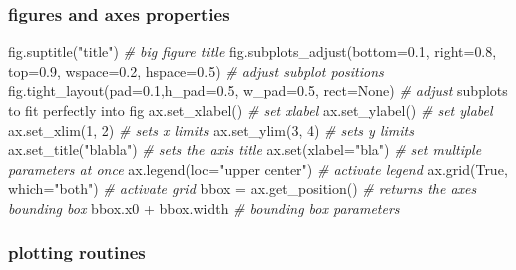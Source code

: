 \documentclass[]{article}
\newenvironment{Shaded}{}{}
\newcommand{\DataTypeTok}[1]{\textcolor[rgb]{0.56,0.13,0.00}{{#1}}}
\newcommand{\DecValTok}[1]{\textcolor[rgb]{0.25,0.63,0.44}{{#1}}}
\newcommand{\FloatTok}[1]{\textcolor[rgb]{0.25,0.63,0.44}{{#1}}}
\newcommand{\StringTok}[1]{\textcolor[rgb]{0.25,0.44,0.63}{{#1}}}
\newcommand{\CommentTok}[1]{\textcolor[rgb]{0.38,0.63,0.69}{\textit{{#1}}}}
\newcommand{\OtherTok}[1]{\textcolor[rgb]{0.00,0.44,0.13}{{#1}}}
\newcommand{\NormalTok}[1]{{#1}}
\begin{document}
\subsubsection{figures and axes properties}

\begin{Shaded}
\begin{Highlighting}[]
\NormalTok{fig.suptitle(}\StringTok{"title"}\NormalTok{) }\CommentTok{# big figure title}
\NormalTok{fig.subplots_adjust(bottom=}\FloatTok{0.1}\NormalTok{, right=}\FloatTok{0.8}\NormalTok{, top=}\FloatTok{0.9}\NormalTok{, wspace=}\FloatTok{0.2}\NormalTok{,}
\NormalTok{hspace=}\FloatTok{0.5}\NormalTok{) }\CommentTok{# adjust subplot positions}
\NormalTok{fig.tight_layout(pad=}\FloatTok{0.1}\NormalTok{,h_pad=}\FloatTok{0.5}\NormalTok{, w_pad=}\FloatTok{0.5}\NormalTok{, rect=}\OtherTok{None}\NormalTok{) }\CommentTok{# adjust}
\NormalTok{subplots to fit perfectly into fig}
\NormalTok{ax.set_xlabel() }\CommentTok{# set xlabel}
\NormalTok{ax.set_ylabel() }\CommentTok{# set ylabel}
\NormalTok{ax.set_xlim(}\DecValTok{1}\NormalTok{, }\DecValTok{2}\NormalTok{) }\CommentTok{# sets x limits}
\NormalTok{ax.set_ylim(}\DecValTok{3}\NormalTok{, }\DecValTok{4}\NormalTok{) }\CommentTok{# sets y limits}
\NormalTok{ax.set_title(}\StringTok{"blabla"}\NormalTok{) }\CommentTok{# sets the axis title}
\NormalTok{ax.}\DataTypeTok{set}\NormalTok{(xlabel=}\StringTok{"bla"}\NormalTok{) }\CommentTok{# set multiple parameters at once}
\NormalTok{ax.legend(loc=}\StringTok{"upper center"}\NormalTok{) }\CommentTok{# activate legend}
\NormalTok{ax.grid(}\OtherTok{True}\NormalTok{, which=}\StringTok{"both"}\NormalTok{) }\CommentTok{# activate grid}
\NormalTok{bbox = ax.get_position() }\CommentTok{# returns the axes bounding box}
\NormalTok{bbox.x0 + bbox.width }\CommentTok{# bounding box parameters}
\end{Highlighting}
\end{Shaded}

\subsubsection{plotting routines}
\end{document}
